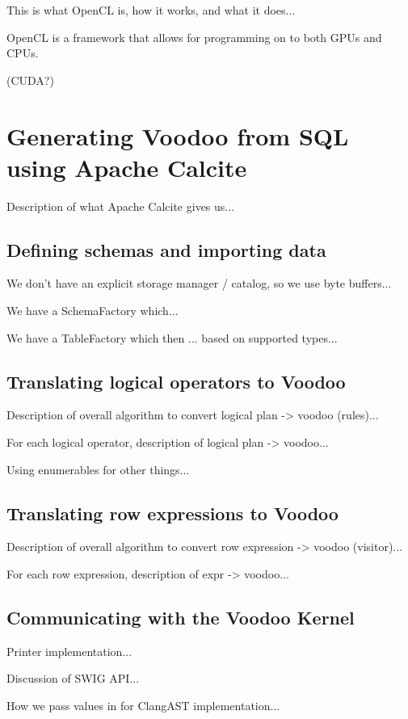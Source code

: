 This is what OpenCL is, how it works, and what it does...

OpenCL is a framework that allows for programming on to both GPUs and CPUs.

(CUDA?)

\section{Generating Voodoo from SQL using Apache Calcite}

Description of what Apache Calcite gives us...

\subsection{Defining schemas and importing data}

We don't have an explicit storage manager / catalog, so we use byte buffers...

We have a SchemaFactory which...

We have a TableFactory which then ... based on supported types...

\subsection{Translating logical operators to Voodoo}

Description of overall algorithm to convert logical plan -> voodoo (rules)...

For each logical operator, description of logical plan -> voodoo...

Using enumerables for other things...

\subsection{Translating row expressions to Voodoo}

Description of overall algorithm to convert row expression -> voodoo (visitor)...

For each row expression, description of expr -> voodoo...

\subsection{Communicating with the Voodoo Kernel}

Printer implementation...

Discussion of SWIG API...

How we pass values in for ClangAST implementation...

